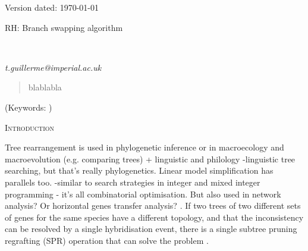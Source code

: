 \documentclass[12pt,letterpaper]{article}
\renewcommand{\section}[1]{%
\bigskip
\begin{center}
\begin{Large}
\normalfont\scshape #1
\medskip
\end{Large}
\end{center}}
\begin{document}
\begin{flushright}
Version dated: \today
\end{flushright}
\bigskip
\noindent RH: Branch swapping algorithm

\bigskip
\medskip
\begin{center}

\bigskip

\\ %
\end{center}
\medskip
{} \textit{t.guillerme@imperial.ac.uk}\\  %
\vspace{1in}

\modulolinenumbers[1]
\linenumbers

%
%

\newpage
\begin{abstract}
blablabla
\end{abstract}

\noindent (Keywords: )\\

\vspace{1.5in}

\newpage 

%
%

\section{Introduction}

Tree rearrangement is used in phylogenetic inference or in macroecology and macroevolution (e.g. comparing trees) %
+ linguistic and philology
-linguistic tree searching, but that's really phylogenetics. Linear model simplification has parallels too.
-similar to search strategies in integer and mixed integer programming - it's all combinatorial optimisation.
But also used in network analysis?
Or horizontal genes transfer analysis? \citep{mcfadden1995something}.
If two trees of two different sets of genes for the same species have a different topology, and that the inconsistency can be resolved by a single hybridisation event, there is a single subtree pruning regrafting (SPR) operation that can solve the problem \citep{bordewich2005computational}.
\end{document}
